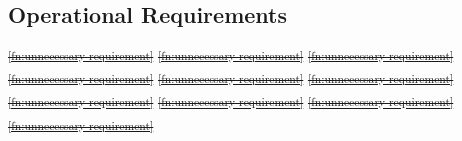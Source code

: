 \documentclass[a4paper,12pt,twoside]{article}
\providecommand{\DIFdeltex}[1]{{\protect\color{red}\sout{#1}}}                      %
\providecommand{\DIFdelbegin}{} %
\providecommand{\DIFdel}[1]{\texorpdfstring{\DIFdeltex{#1}}{}} %
\newcommand{\DIFscaledelfig}{0.5}
\newlength{\DIFdelgraphicswidth} %
\newlength{\DIFdelgraphicsheight} %
\newcommand{\DIFdelincludegraphics}[2][]{%
\sbox{\DIFdelgraphicsbox}{\DIFOincludegraphics[#1]{#2}}%
\settoboxwidth{\DIFdelgraphicswidth}{\DIFdelgraphicsbox} %
\settoboxtotalheight{\DIFdelgraphicsheight}{\DIFdelgraphicsbox} %
\scalebox{\DIFscaledelfig}{%
\parbox[b]{\DIFdelgraphicswidth}{\usebox{\DIFdelgraphicsbox}\\[-\baselineskip] \rule{\DIFdelgraphicswidth}{0em}}\llap{\resizebox{\DIFdelgraphicswidth}{\DIFdelgraphicsheight}{%
\setlength{\unitlength}{\DIFdelgraphicswidth}%
\begin{picture}(1,1)%
\thicklines\linethickness{2pt} %
{\color[rgb]{1,0,0}\put(0,0){\framebox(1,1){}}}%
{\color[rgb]{1,0,0}\put(0,0){\line( 1,1){1}}}%
{\color[rgb]{1,0,0}\put(0,1){\line(1,-1){1}}}%
\end{picture}%
}\hspace*{3pt}}} %
} %
\DeclareRobustCommand{\DIFdelbegin}{\DIFOdelbegin \let\includegraphics\DIFdelincludegraphics} %
\begin{document}
\subsection{Operational Requirements}

\DIFdelbegin %
\DIFdel{\textsuperscript{\ref{fn:unnecessary-requirement}}
    }%
\DIFdel{\textsuperscript{\ref{fn:unnecessary-requirement}}
    }%
\DIFdel{\textsuperscript{\ref{fn:unnecessary-requirement}}
    }%
\DIFdel{\textsuperscript{\ref{fn:unnecessary-requirement}}
    }%
\DIFdel{\textsuperscript{\ref{fn:unnecessary-requirement}}
    }%
\DIFdel{\textsuperscript{\ref{fn:unnecessary-requirement}}
    }%
\DIFdel{\textsuperscript{\ref{fn:unnecessary-requirement}}
    }%
\DIFdel{\textsuperscript{\ref{fn:unnecessary-requirement}}
    }%
\DIFdel{\textsuperscript{\ref{fn:unnecessary-requirement}}
    }%
\DIFdel{\textsuperscript{\ref{fn:unnecessary-requirement}}
    }%
\end{document}
